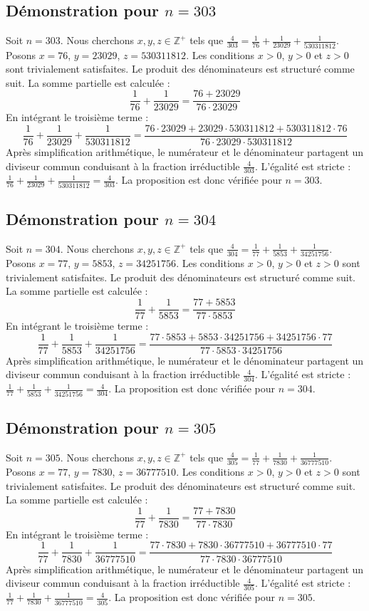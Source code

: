 \documentclass[11pt,a4paper]{article}
\begin{document}
\subsection{Démonstration pour $n = 303$}
Soit $n = 303$. Nous cherchons $x, y, z \in \mathbb{Z}^{+}$ tels que $\frac{4}{303} = \frac{1}{76} + \frac{1}{23029} + \frac{1}{530311812}$.
Posons $x = 76$, $y = 23029$, $z = 530311812$.
Les conditions $x > 0$, $y > 0$ et $z > 0$ sont trivialement satisfaites.
Le produit des dénominateurs est structuré comme suit. La somme partielle est calculée :
$$ \frac{1}{76} + \frac{1}{23029} = \frac{76+23029}{76 \cdot 23029} $$
En intégrant le troisième terme :
$$ \frac{1}{76} + \frac{1}{23029} + \frac{1}{530311812} = \frac{76 \cdot 23029 + 23029 \cdot 530311812 + 530311812 \cdot 76}{76 \cdot 23029 \cdot 530311812} $$
Après simplification arithmétique, le numérateur et le dénominateur partagent un diviseur commun conduisant à la fraction irréductible $\frac{4}{303}$.
L'égalité est stricte : $\frac{1}{76} + \frac{1}{23029} + \frac{1}{530311812} = \frac{4}{303}$.
La proposition est donc vérifiée pour $n = 303$.
\subsection{Démonstration pour $n = 304$}
Soit $n = 304$. Nous cherchons $x, y, z \in \mathbb{Z}^{+}$ tels que $\frac{4}{304} = \frac{1}{77} + \frac{1}{5853} + \frac{1}{34251756}$.
Posons $x = 77$, $y = 5853$, $z = 34251756$.
Les conditions $x > 0$, $y > 0$ et $z > 0$ sont trivialement satisfaites.
Le produit des dénominateurs est structuré comme suit. La somme partielle est calculée :
$$ \frac{1}{77} + \frac{1}{5853} = \frac{77+5853}{77 \cdot 5853} $$
En intégrant le troisième terme :
$$ \frac{1}{77} + \frac{1}{5853} + \frac{1}{34251756} = \frac{77 \cdot 5853 + 5853 \cdot 34251756 + 34251756 \cdot 77}{77 \cdot 5853 \cdot 34251756} $$
Après simplification arithmétique, le numérateur et le dénominateur partagent un diviseur commun conduisant à la fraction irréductible $\frac{4}{304}$.
L'égalité est stricte : $\frac{1}{77} + \frac{1}{5853} + \frac{1}{34251756} = \frac{4}{304}$.
La proposition est donc vérifiée pour $n = 304$.
\subsection{Démonstration pour $n = 305$}
Soit $n = 305$. Nous cherchons $x, y, z \in \mathbb{Z}^{+}$ tels que $\frac{4}{305} = \frac{1}{77} + \frac{1}{7830} + \frac{1}{36777510}$.
Posons $x = 77$, $y = 7830$, $z = 36777510$.
Les conditions $x > 0$, $y > 0$ et $z > 0$ sont trivialement satisfaites.
Le produit des dénominateurs est structuré comme suit. La somme partielle est calculée :
$$ \frac{1}{77} + \frac{1}{7830} = \frac{77+7830}{77 \cdot 7830} $$
En intégrant le troisième terme :
$$ \frac{1}{77} + \frac{1}{7830} + \frac{1}{36777510} = \frac{77 \cdot 7830 + 7830 \cdot 36777510 + 36777510 \cdot 77}{77 \cdot 7830 \cdot 36777510} $$
Après simplification arithmétique, le numérateur et le dénominateur partagent un diviseur commun conduisant à la fraction irréductible $\frac{4}{305}$.
L'égalité est stricte : $\frac{1}{77} + \frac{1}{7830} + \frac{1}{36777510} = \frac{4}{305}$.
La proposition est donc vérifiée pour $n = 305$.
\end{document}
